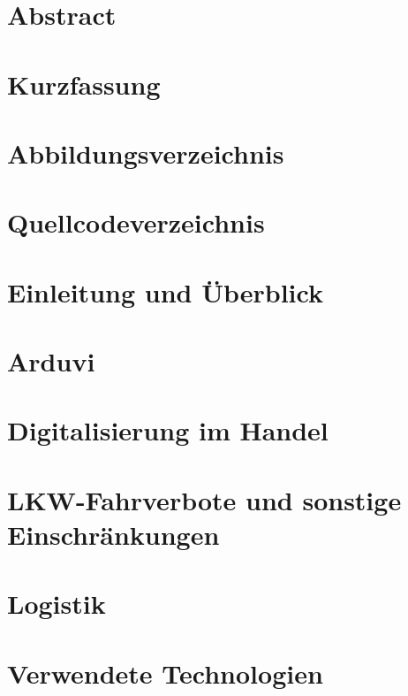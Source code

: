 \documentclass[12pt]{report}
\begin{document}
    \chapter*{Abstract}
    

    \chapter*{Kurzfassung}
    

    \tableofcontents

    \chapter*{Abbildungsverzeichnis}
    

    \chapter*{Quellcodeverzeichnis}
    


    \chapter{Einleitung und Überblick}
    

    \chapter{Arduvi}
    

    \chapter{Digitalisierung im Handel}
    

    \chapter{LKW-Fahrverbote und sonstige Einschränkungen}
    

    \chapter{Logistik}
    

    \chapter{Verwendete Technologien}
    
\end{document}
